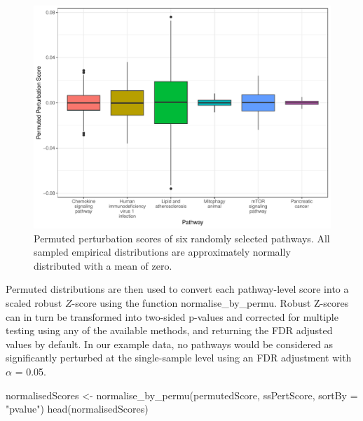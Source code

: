 \documentclass[9pt,a4paper,]{extarticle}
\newenvironment{Shaded}{\begin{snugshade}}{\end{snugshade}}
\newcommand{\AttributeTok}[1]{\textcolor[rgb]{0.77,0.63,0.00}{#1}}
\newcommand{\FunctionTok}[1]{\textcolor[rgb]{0.00,0.00,0.00}{#1}}
\newcommand{\NormalTok}[1]{#1}
\newcommand{\OtherTok}[1]{\textcolor[rgb]{0.56,0.35,0.01}{#1}}
\newcommand{\StringTok}[1]{\textcolor[rgb]{0.31,0.60,0.02}{#1}}
\begin{document}
\begin{figure}

{\centering \includegraphics[width=1\linewidth]{sSNAPPY_paper_files/figure-latex/Figure2-1} 

}

\caption{Permuted perturbation scores of six randomly selected pathways. All sampled empirical distributions are approximately normally distributed with a mean of zero.}\label{fig:Figure2}
\end{figure}

Permuted distributions are then used to convert each pathway-level score into a scaled robust \(Z\)-score using the function normalise\_by\_permu.
Robust Z-scores can in turn be transformed into two-sided p-values and corrected for multiple testing using any of the available methods, and returning the FDR adjusted values by default.
In our example data, no pathways would be considered as significantly perturbed at the single-sample level using an FDR adjustment with \(\alpha\) = 0.05.

\begin{Shaded}
\begin{Highlighting}[]
\NormalTok{normalisedScores }\OtherTok{\textless{}{-}} \FunctionTok{normalise\_by\_permu}\NormalTok{(permutedScore, ssPertScore, }
                                       \AttributeTok{sortBy =} \StringTok{"pvalue"}\NormalTok{)}
\FunctionTok{head}\NormalTok{(normalisedScores)}
\end{Highlighting}
\end{Shaded}
\end{document}
